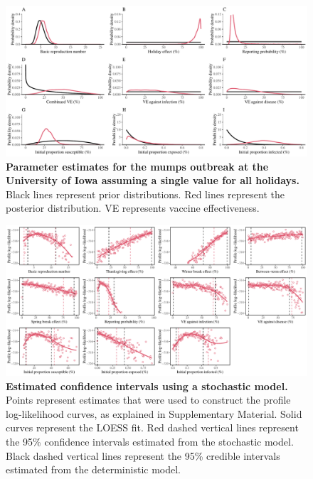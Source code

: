 \documentclass[12pt]{article}
\begin{document}
\pagebreak

\begin{figure}[!th]
\begin{center}
\includegraphics[width=\textwidth]{../figure_stanfit_seirv_final/figure_stanfit_param_avg.pdf}
\caption{
\textbf{Parameter estimates for the mumps outbreak at the University of Iowa assuming a single value for all holidays.}
Black lines represent prior distributions.
Red lines represent the posterior distribution.
VE represents vaccine effectiveness.
}
\end{center}
\end{figure}

\pagebreak

\begin{figure}[!h]
\includegraphics[width=\textwidth]{../pomp/figure_pomp_loglik.pdf}
\caption{
\textbf{Estimated confidence intervals using a stochastic model.}
Points represent estimates that were used to construct the profile log-likelihood curves, as explained in Supplementary Material.
Solid curves represent the LOESS fit.
Red dashed vertical lines represent the 95\% confidence intervals estimated from the stochastic model.
Black dashed vertical lines represent the 95\% credible intervals estimated from the deterministic model.
}
\end{figure}
\end{document}
